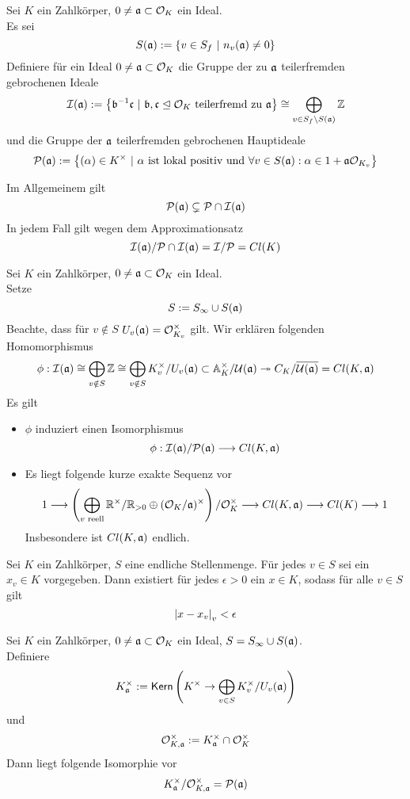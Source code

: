 Sei $K$ ein Zahlkörper, $0\neq \mathfrak{a} \subset \mathcal{O}_K$ ein Ideal.\\
Es sei
\[ S(\af) := \set{v \in S_f}{n_v(\af) \neq 0} \]
Definiere für ein Ideal $0\neq \mathfrak{a} \subset \mathcal{O}_K$ die Gruppe der zu $\mathfrak{a}$ teilerfremden gebrochenen Ideale
\[ \I(\af) := \set{\bf\i \cf}{\bf,\cf \trianglelefteq \O_K \text{ teilerfremd zu } \af} \isom{} \bigoplus_{v\in S_f \setminus S(\af)}\Z \]
und die Gruppe der $\mathfrak{a}$ teilerfremden gebrochenen Hauptideale
\[ \P(\af) := \set{(\alpha) \in K^\times}{\alpha \text{ ist lokal positiv und }\forall v \in S(\af): \alpha \in 1 + \af\O_{K_v}}  \]

\Bem{}
Im Allgemeinem gilt
\[ \mathcal{P}(\mathfrak{a}) \subsetneq \mathcal{P} \cap \mathcal{I}(\mathfrak{a}) \]
In jedem Fall gilt wegen dem Approximationsatz
\[ \mathcal{I}(\mathfrak{a}) / \mathcal{P} \cap \mathcal{I}(\mathfrak{a}) = \mathcal{I} / \mathcal{P} = Cl(K) \]

\Satz{}
Sei $K$ ein Zahlkörper, $0\neq \mathfrak{a} \subset \mathcal{O}_K$ ein Ideal.\\
Setze
\[ S:= S_\infty \cup S(\mathfrak{a}) \]
Beachte, dass für $v \notin S$ $U_v(\mathfrak{a}) = \mathcal{O}_{K_v}^\times$ gilt. Wir erklären folgenden Homomorphismus
\begin{align*}
\phi : \mathcal{I}(\mathfrak{a}) \overset{}{\cong} \bigoplus_{v\notin S} \mathbb{Z} \overset{}{\cong} \bigoplus_{v\notin S} K_v^\times / U_v(\mathfrak{a}) \subset \mathbb{A}_K^\times / \mathcal{U}(\mathfrak{a}) \overset{}{\twoheadrightarrow} C_K / \overline{\mathcal{U}(\mathfrak{a})} = Cl(K,\mathfrak{a})  
\end{align*}
Es gilt
\begin{itemize}
\item $\phi$ induziert einen Isomorphismus
\[ \phi : \mathcal{I}(\mathfrak{a}) / \mathcal{P}(\mathfrak{a}) \overset{}{\longrightarrow} Cl(K,\mathfrak{a}) \]
\item Es liegt folgende kurze exakte Sequenz vor
\[ 1 \overset{}{\longrightarrow} \left( \bigoplus_{v \text{ reell}} \mathbb{R}^\times / \mathbb{R}_{>0} \oplus (\mathcal{O}_K / \mathfrak{a})^\times \right) / \mathcal{O}_K^\times \overset{}{\longrightarrow} Cl(K,\mathfrak{a}) \overset{}{\longrightarrow} Cl(K) \overset{}{\longrightarrow} 1 \]
Insbesondere ist $Cl(K,\mathfrak{a})$ endlich.
\end{itemize}

Sei $K$ ein Zahlkörper, $S$ eine endliche Stellenmenge. Für jedes $v \in S$ sei ein $x_v \in K$ vorgegeben. Dann existiert für jedes $\epsilon >0$ ein $x \in K$, sodass für alle $v \in S$ gilt
\[ \left|x-x_v\right|_v < \epsilon \]

\Def{}
Sei $K$ ein Zahlkörper, $0\neq \mathfrak{a} \subset \mathcal{O}_K$ ein Ideal, $S = S_\infty \cup S(\mathfrak{a})$.\\
Definiere
\[ K_{\mathfrak{a}}^\times := \textsf{Kern}\left( K^\times \overset{}{\rightarrow} \bigoplus_{v\in S } K_v^\times / U_v(\mathfrak{a})\right)  \]
und
\[\mathcal{O}_{K,\mathfrak{a}}^\times := K_{\mathfrak{a}}^\times \cap \mathcal{O}_K^\times \]
Dann liegt folgende Isomorphie vor
\[ K_{\mathfrak{a}}^\times / \mathcal{O}_{K,\mathfrak{a}}^\times = \mathcal{P}(\mathfrak{a}) \]


